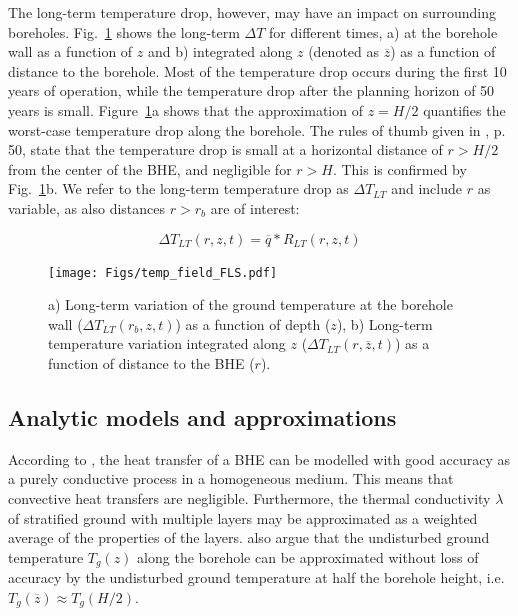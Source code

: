 The long-term temperature drop, however, may have an impact on surrounding boreholes. Fig.~\ref{fig:T_field} shows the long-term $\Delta T$ for different times, a) at the borehole wall as a function of $z$ and b) integrated along $z$ (denoted as $\overline{z}$) as a function of distance to the borehole. Most of the temperature drop occurs during the first 10 years of operation, while the temperature drop after the planning horizon of 50 years is small. 
Figure~\ref{fig:T_field}a shows that the approximation of $z=H/2$ quantifies the worst-case temperature drop along the borehole. The rules of thumb given in \citep{pahud_geothermal_2002}, p. 50, state that the temperature drop is small at a horizontal distance of $r>H/2$ from the center of the BHE, and negligible for $r>H$. This is confirmed by Fig.~\ref{fig:T_field}b. 
We refer to the long-term temperature drop as $\Delta T_{LT}$ and include $r$ as variable, as also distances $r>r_b$ are of interest:

\begin{equation}
    \Delta T_{LT}(r, z, t) = \overline{q} * R_{LT}(r, z, t)
\end{equation}

\begin{figure}
    \centering
    \texttt{[image: Figs/temp\_field\_FLS.pdf]}
    \caption{a) Long-term variation of the ground temperature at the borehole wall ($\Delta T_{LT}(r_b, z, t)$) as a function of depth ($z$), b) Long-term temperature variation integrated along $z$ ($\Delta T_{LT}(r, \overline{z}, t)$) as a function of distance to the BHE ($r$).}
    \label{fig:T_field}
\end{figure}

\subsection{Analytic models and approximations}

According to \citet{claesson_conductive_1988}, the heat transfer of a BHE can be modelled with good accuracy as a purely conductive process in a homogeneous medium. This means that convective heat transfers are negligible. Furthermore, the thermal conductivity $\lambda$ of stratified ground with multiple layers may be approximated as a weighted average of the properties of the layers. 
\citet{claesson_conductive_1988} also argue that the undisturbed ground temperature $T_g(z)$ along the borehole can be approximated without loss of accuracy by the undisturbed ground temperature at half the borehole height, i.e. $T_g(\overline{z}) \approx T_g(H/2)$. 


